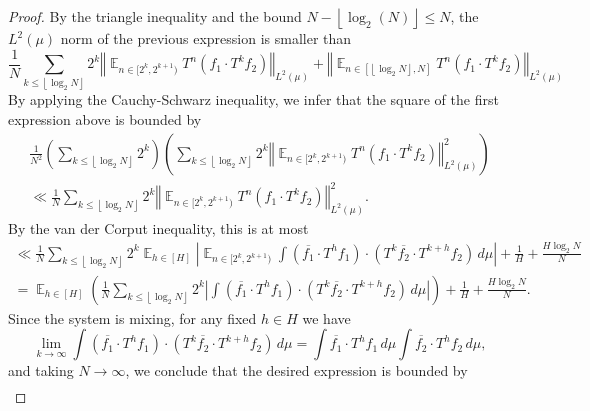 \documentclass[11pt]{amsart}
\theoremstyle{definition}
\DeclareMathOperator*{\E}{\mathbb{E}}
\newcommand{\norm}[1]{\left\Vert #1\right\Vert}
\newcommand{\1}{{\mathbf{1}}}
\newcommand{\floor}[1]{{\left \lfloor #1 \right \rfloor}}
\begin{document}
\begin{proof}
By the triangle inequality and the bound $N-\floor{\log_2(N)}\leq N$, the $L^2(\mu)$ norm of the previous expression is smaller than \begin{equation*}
    \frac{1}{N}\sum_{k\leq \floor{\log_2 N}}2^k \norm{\E_{n\in[2^k,2^{k+1})} T^n(f_1\cdot T^{k}f_2)}_{L^2(\mu)} + \norm{\E_{n\in[\floor{\log_2 N}, N]}T^n(f_1\cdot T^{k}f_2)}_{L^2(\mu)}
\end{equation*}
    By applying the Cauchy-Schwarz inequality, we infer that the square of the first expression above is bounded by
    \begin{multline*}
        \frac{1}{N^2}\left(\sum_{k\leq \floor{\log_2 N}}2^k \right)\left(\sum_{k\leq \floor{\log_2 N}} 2^k\norm{\E_{n\in[2^k,2^{k+1})} T^n(f_1\cdot T^{k}f_2)}_{L^2(\mu)}^2\right)\\
        \ll \frac{1}{N}\sum_{k\leq \floor{\log_2 N}} 2^k\norm{\E_{n\in[2^k,2^{k+1})} T^n(f_1\cdot T^{k}f_2)}_{L^2(\mu)}^2.
    \end{multline*}
    By the van der Corput inequality, this is at most 
    \begin{multline*}
       \ll\frac{1}{N}\sum_{k\leq \floor{\log_2 N}} 2^k\E_{h\in[H]}\left| \E_{n\in[2^k,2^{k+1})}\int(\overline{f_1}\cdot T^h f_1)\cdot (T^k\overline{f_2}\cdot T^{k+h} f_2) \, d\mu\right|+ {\frac{1}{H}+\frac{H\log_2 N}{N}}\\
         =\E_{h\in[H]} \left(\frac{1}{N}\sum_{k\leq \floor{\log_2 N}}2^k \left|\int (\overline{f_1}\cdot T^h f_1)\cdot (T^k\overline{f_2}\cdot T^{k+h} f_2) \, d\mu\right|\right)+{\frac{1}{H}+\frac{H\log_2 N}{N}}.
    \end{multline*}
    Since the system is mixing, for any fixed $h\in H$ we have
    \begin{equation*}
        \lim\limits_{k\to\infty} \int (\overline{f_1}\cdot T^h f_1)\cdot (T^k\overline{f_2}\cdot T^{k+h} f_2) \, d\mu=\int \overline{f_1}\cdot T^h f_1\, d\mu \int \overline{f_2}\cdot T^h f_2\, d\mu,
    \end{equation*}
    and taking $N\to\infty$, we conclude that the desired expression is bounded by 
    \begin{multline*}

\end{multline*}
\end{proof}
\end{document}
